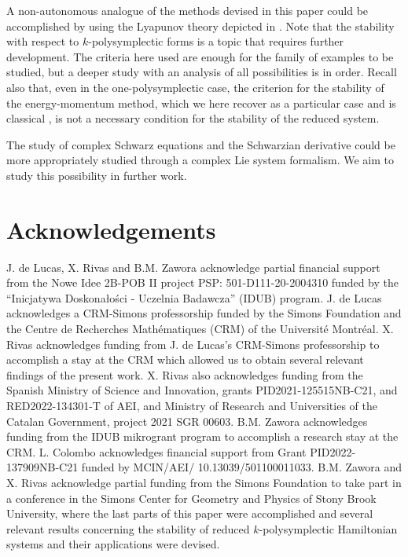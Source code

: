 \documentclass[11pt]{article}
\theoremstyle{plain}
\theoremstyle{definition}
\numberwithin{equation}{section}
\begin{document}
A non-autonomous analogue of the methods devised in this paper could be accomplished by using the Lyapunov theory depicted in \cite{LZ_21}. Note that the stability with respect to $k$-polysymplectic forms is a topic that requires further development. The criteria here used are enough for the family of examples to be studied, but a deeper study with an analysis of all possibilities is in order. Recall also that, even in the one-polysymplectic case, the criterion for the stability of the energy-momentum method, which we here recover as a particular case and is classical \cite{AM_78}, is not a necessary condition for the stability of the reduced system.

The study of complex Schwarz equations and the Schwarzian derivative could be more appropriately studied through a complex Lie system formalism. We aim to study this possibility in further work.

\section*{Acknowledgements}


J. de Lucas, X. Rivas and B.M. Zawora acknowledge partial financial support from the Nowe Idee 2B-POB II project PSP: 501-D111-20-2004310 funded by the ``Inicjatywa Doskonałości - Uczelnia Badawcza'' (IDUB) program. J. de Lucas acknowledges a CRM-Simons professorship funded by the Simons Foundation and the Centre de Recherches Math\'ematiques (CRM) of the Universit\'e Montr\'eal. X. Rivas acknowledges funding from J. de Lucas's CRM-Simons professorship to accomplish a stay at the CRM which allowed us to obtain several relevant findings of the present work. X. Rivas also acknowledges funding from the Spanish Ministry of Science and Innovation, grants  PID2021-125515NB-C21, and RED2022-134301-T of AEI, and Ministry of Research and Universities of the Catalan Government, project 2021 SGR 00603. B.M. Zawora acknowledges funding from the IDUB mikrogrant program to accomplish a research stay at the CRM. L. Colombo acknowledges financial support from Grant PID2022-137909NB-C21 funded by MCIN/AEI/ 10.13039/501100011033. B.M. Zawora and X. Rivas acknowledge partial funding from the Simons Foundation to take part in a conference in the Simons Center for Geometry and Physics of Stony Brook University, where the last parts of this paper were accomplished and several relevant results concerning the stability of reduced $k$-polysymplectic Hamiltonian systems and their applications were devised.
\end{document}
